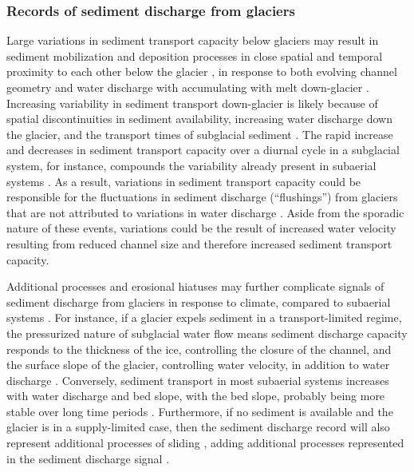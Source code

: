 \documentclass[11pt]{article}
\begin{document}
\begin{spacing}{1}
  
  \subsubsection{Records of sediment discharge  from glaciers}
  
  Large variations in sediment transport capacity below glaciers may result in sediment mobilization and deposition processes in close spatial and temporal proximity to each other below the glacier \citep{gimbert2016,perolo2018}, in response to both evolving channel geometry and water discharge with accumulating with melt down-glacier \citep{beaud2018,delaney2019}.
  Increasing variability in sediment transport down-glacier is likely because of spatial discontinuities in sediment availability, increasing water discharge down the glacier, and the transport times of subglacial sediment \citep{williams1989,delaney2019}.
  The rapid increase and decreases in sediment transport capacity over a diurnal cycle in a subglacial system, for instance, compounds the variability already present in subaerial systems \citep{williams1989,jerolmack2010}.
  As a result, variations in sediment transport capacity could be responsible for the fluctuations in sediment discharge (``flushings'') from glaciers that are not attributed to variations in water discharge \citep[e.g.][]{richards2003,swift2021}.
  Aside from the sporadic nature of these events, variations could be the result of increased water velocity resulting from reduced channel size and therefore increased sediment transport capacity.

  Additional processes and erosional hiatuses may further complicate signals of sediment discharge from glaciers in response to climate, compared to subaerial systems \citep{jansson2005,ganti2016}. 
  For instance, if a glacier expels sediment in a transport-limited regime, the pressurized nature of subglacial water flow means sediment discharge capacity responds to the thickness of the ice, controlling the closure of the channel, and the surface slope of the glacier, controlling water velocity, in addition to water discharge \citep[Section~\ref{sect:sub_mode}; ] []{rothlisberger1972,shreve1972}.
  Conversely, sediment transport in most subaerial systems increases with water discharge and bed slope, with the bed slope, probably being more stable over long time periods \citep[Section~\ref{sect:fluv}; e.g.][]{muller1968,whipple1999,wong2006}. 
  Furthermore, if no sediment is available and the glacier is in a supply-limited case, then the sediment discharge record will also represent additional processes of sliding  \citep{herman2015,seguinot2021}, adding additional processes represented in the sediment discharge signal \citep{delaney2019}.
  

\end{spacing}
\end{document}
